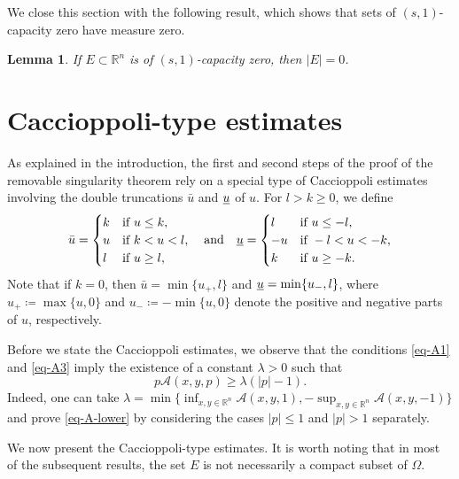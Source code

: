 \documentclass{amsart}
\theoremstyle{plain}
\newtheorem{lemma}[theorem]{Lemma}
\theoremstyle{definition}
\numberwithin{equation}{section}
\begin{document}
We close this section with the following result, which shows that sets of $(s, 1)$-capacity zero have measure zero.

\begin{lemma}\label{lem-measure}\cite[Lemma~2.15]{KL24}
If $E \subset \mathbb{R}^n$ is of $(s, 1)$-capacity zero, then $|E|=0$.
\end{lemma}

\section{Caccioppoli-type estimates}\label{sec-Caccio}

As explained in the introduction, the first and second steps of the proof of the removable singularity theorem rely on a special type of Caccioppoli estimates involving the double truncations $\bar{u}$ and $\underbar{$u$}$ of $u$. For $l>k\geq0$, we define
\begin{equation}\label{eq-truncation}
\bar{u}=
\begin{cases}
k &\text{if } u \leq k, \\
u &\text{if } k < u < l, \\
l &\text{if } u \geq l,
\end{cases}
\quad\text{and}\quad
\underbar{$u$}=
\begin{cases}
l &\text{if } u \leq -l, \\
-u &\text{if } -l < u < -k, \\
k &\text{if } u \geq -k.
\end{cases}
\end{equation}
Note that if $k=0$, then $\bar{u}=\min\{u_+, l\}$ and $\underbar{$u$}=\min\{u_-, l\}$, where $u_+\coloneqq \max\{u, 0\}$ and $u_-\coloneqq -\min\{u, 0\}$ denote the positive and negative parts of $u$, respectively.

Before we state the Caccioppoli estimates, we observe that the conditions \eqref{eq-A1} and \eqref{eq-A3} imply the existence of a constant $\lambda > 0$ such that
\begin{equation}\label{eq-A-lower}
p\mathscr{A}(x, y, p) \geq \lambda (|p| - 1).
\end{equation}
Indeed, one can take $\lambda = \min\{\inf_{x, y \in \mathbb{R}^n} \mathscr{A}(x, y, 1), -\sup_{x, y \in \mathbb{R}^n} \mathscr{A}(x, y, -1)\}$ and prove \eqref{eq-A-lower} by considering the cases $|p| \leq 1$ and $|p|>1$ separately.

We now present the Caccioppoli-type estimates. It is worth noting that in most of the subsequent results, the set $E$ is not necessarily a compact subset of $\Omega$.
\end{document}
